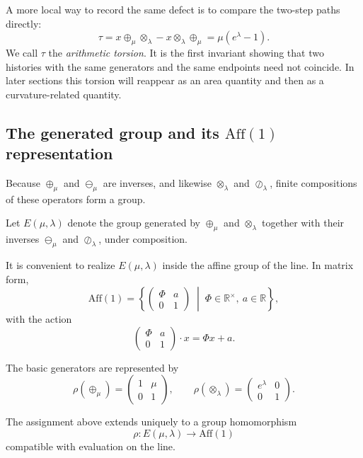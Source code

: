 A more local way to record the same defect is to compare the two-step paths directly:
\begin{equation}
\tau = x\oplus_\mu\otimes_\lambda - x\otimes_\lambda\oplus_\mu
= \mu(e^{\lambda}-1).
\label{eq:torsion}
\end{equation}
We call $\tau$ the \emph{arithmetic torsion}. It is the first invariant showing that two histories with the same generators and the same endpoints need not coincide. In later sections this torsion will reappear as an area quantity and then as a curvature-related quantity.

\subsection{The generated group and its \texorpdfstring{$\mathrm{Aff}(1)$}{Aff(1)} representation}
\label{subsec:generated_group_affine}

Because $\oplus_\mu$ and $\ominus_\mu$ are inverses, and likewise $\otimes_\lambda$ and $\oslash_\lambda$, finite compositions of these operators form a group.

\begin{definition}
Let $E(\mu,\lambda)$ denote the group generated by $\oplus_\mu$ and $\otimes_\lambda$ together with their inverses $\ominus_\mu$ and $\oslash_\lambda$, under composition.
\end{definition}

It is convenient to realize $E(\mu,\lambda)$ inside the affine group of the line. In matrix form,
\[
\mathrm{Aff}(1)=\left\{
\begin{pmatrix}
\Phi & a\\
0 & 1
\end{pmatrix}
\;
\middle|
\;
\Phi\in\mathbb{R}^{\times},\ a\in\mathbb{R}
\right\},
\]
with the action
\[
\begin{pmatrix}
\Phi & a\\
0 & 1
\end{pmatrix}\cdot x = \Phi x + a.
\]

The basic generators are represented by
\[
\rho(\oplus_\mu)=
\begin{pmatrix}
1 & \mu\\
0 & 1
\end{pmatrix},
\qquad
\rho(\otimes_\lambda)=
\begin{pmatrix}
e^{\lambda} & 0\\
0 & 1
\end{pmatrix}.
\]

\begin{lemma}
The assignment above extends uniquely to a group homomorphism
\[
\rho:E(\mu,\lambda)\to \mathrm{Aff}(1)
\]
compatible with evaluation on the line.
\end{lemma}

